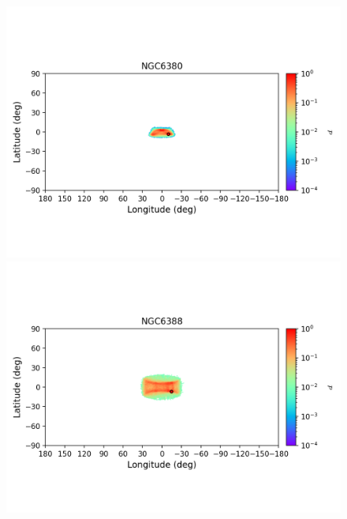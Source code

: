         \begin{figure}
            \begin{center}
                \includegraphics[clip=true, trim = 0mm 20mm 0mm 10mm, width=1\columnwidth]{images/error_plots_NGC6380.png}
                \includegraphics[clip=true, trim = 0mm 20mm 0mm 10mm, width=1\columnwidth]{images/error_plots_NGC6388.png}
                

\end{center}
\end{figure}
